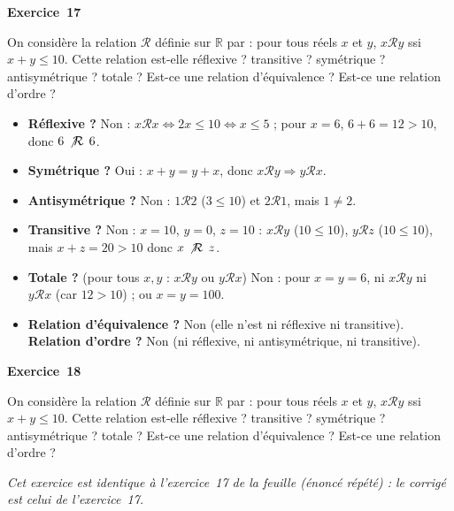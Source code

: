 \documentclass[11pt,a4paper]{article}
\newcommand{\meme}[1]{\emph{Cet exercice est identique à l'exercice~#1 de la feuille (énoncé répété) : le corrigé est celui de l'exercice~#1.}}
\begin{document}
	\medskip\noindent\textbf{\Large\color{bleu}Exercice~17}\nopagebreak
	\begin{enonce}
		On considère la relation $\mathcal{R}$ définie sur $\mathbb{R}$ par : pour tous réels $x$ et $y$, $x\mathcal{R}y$ ssi $x+y \le 10$. Cette relation est-elle réflexive ? transitive ? symétrique ? antisymétrique ? totale ? Est-ce une relation d'équivalence ? Est-ce une relation d'ordre ?
	\end{enonce}
	\begin{corrige}
		\begin{itemize}
			\item \textbf{Réflexive ?} Non : $x\mathcal Rx\iff2x\leq10\iff x\leq5$ ; pour $x=6$, $6+6=12>10$, donc $6\,\mathrel{\not\mathcal{R}}\,6$.
			\item \textbf{Symétrique ?} Oui : $x+y=y+x$, donc $x\mathcal Ry\Rightarrow y\mathcal Rx$.
			\item \textbf{Antisymétrique ?} Non : $1\mathcal R2$ ($3\leq10$) et $2\mathcal R1$, mais $1\neq2$.
			\item \textbf{Transitive ?} Non : $x=10$, $y=0$, $z=10$ : $x\mathcal Ry$ ($10\leq10$), $y\mathcal Rz$ ($10\leq10$), mais $x+z=20>10$ donc $x\,\mathrel{\not\mathcal{R}}\,z$.
			\item \textbf{Totale ?} (pour tous $x,y$ : $x\mathcal Ry$ ou $y\mathcal Rx$) Non : pour $x=y=6$, ni $x\mathcal Ry$ ni $y\mathcal Rx$ (car $12>10$) ; ou $x=y=100$.
			\item \textbf{Relation d'équivalence ?} Non (elle n'est ni réflexive ni transitive). \textbf{Relation d'ordre ?} Non (ni réflexive, ni antisymétrique, ni transitive).
		\end{itemize}
	\end{corrige}
	
	\medskip\noindent\textbf{\Large\color{bleu}Exercice~18}\nopagebreak
	\begin{enonce}
		On considère la relation $\mathcal{R}$ définie sur $\mathbb{R}$ par : pour tous réels $x$ et $y$, $x\mathcal{R}y$ ssi $x+y \le 10$. Cette relation est-elle réflexive ? transitive ? symétrique ? antisymétrique ? totale ? Est-ce une relation d'équivalence ? Est-ce une relation d'ordre ?
	\end{enonce}
	\begin{corrige}
		\meme{17}
	\end{corrige}
	
\end{document}
